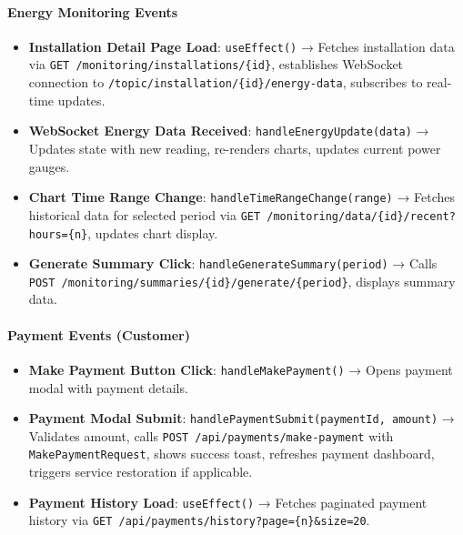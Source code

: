\paragraph{Energy Monitoring Events}
\begin{itemize}
    \item \textbf{Installation Detail Page Load}: \texttt{useEffect()} → Fetches installation data via \texttt{GET /monitoring/installations/\{id\}}, establishes WebSocket connection to \texttt{/topic/installation/\{id\}/energy-data}, subscribes to real-time updates.
    \item \textbf{WebSocket Energy Data Received}: \texttt{handleEnergyUpdate(data)} → Updates state with new reading, re-renders charts, updates current power gauges.
    \item \textbf{Chart Time Range Change}: \texttt{handleTimeRangeChange(range)} → Fetches historical data for selected period via \texttt{GET /monitoring/data/\{id\}/recent?hours=\{n\}}, updates chart display.
    \item \textbf{Generate Summary Click}: \texttt{handleGenerateSummary(period)} → Calls \texttt{POST /monitoring/summaries/\{id\}/generate/\{period\}}, displays summary data.
\end{itemize}

\paragraph{Payment Events (Customer)}
\begin{itemize}
    \item \textbf{Make Payment Button Click}: \texttt{handleMakePayment()} → Opens payment modal with payment details.
    \item \textbf{Payment Modal Submit}: \texttt{handlePaymentSubmit(paymentId, amount)} → Validates amount, calls \texttt{POST /api/payments/make-payment} with \texttt{MakePaymentRequest}, shows success toast, refreshes payment dashboard, triggers service restoration if applicable.
    \item \textbf{Payment History Load}: \texttt{useEffect()} → Fetches paginated payment history via \texttt{GET /api/payments/history?page=\{n\}\&size=20}.
\end{itemize}


